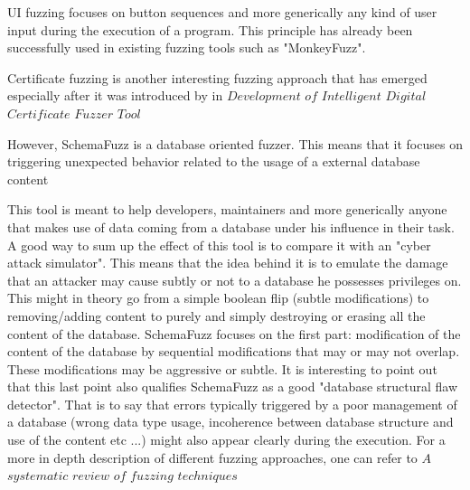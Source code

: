 \documentclass{article}
\begin{document}
\begin{empfile}
UI fuzzing focuses on button sequences and more generically any kind of user input during the execution of a program. This principle has already been successfully used in existing fuzzing tools such as  "MonkeyFuzz".

Certificate fuzzing is another interesting fuzzing approach that has emerged especially after it was introduced by \cite{Certif} in $Development$ $of$ $Intelligent$ $Digital$ $Certificate$ $Fuzzer$ $Tool$

However, SchemaFuzz is a database oriented fuzzer. This means that it focuses on triggering unexpected behavior related to the usage of a external database content   

This tool is meant to help developers, maintainers and more generically anyone that makes use of data coming from a database under his influence in their task. A good way to sum up the effect of this tool is to compare it with an "cyber attack simulator".
This means that the idea behind it is to emulate the damage that an attacker may cause subtly or not to a database he possesses privileges on. This might in theory go from a simple boolean flip (subtle modifications) to removing/adding content to purely and simply destroying or erasing all the content of the database.
SchemaFuzz focuses on the first part: modification of the content of the database by sequential modifications that may or may not overlap. These modifications may be   aggressive or subtle.
It is interesting to point out that this last point also qualifies SchemaFuzz as a good "database structural flaw detector".
That is to say that errors typically triggered by a poor management of a database (wrong data type usage, incoherence between database structure and use of the content etc ...) might also appear clearly during the execution.
For a more in depth description of different fuzzing approaches, one can refer to $A$ $systematic$ $review$ $of$ $fuzzing$ $techniques$ \cite{Systematic}


\end{empfile}
\end{document}
